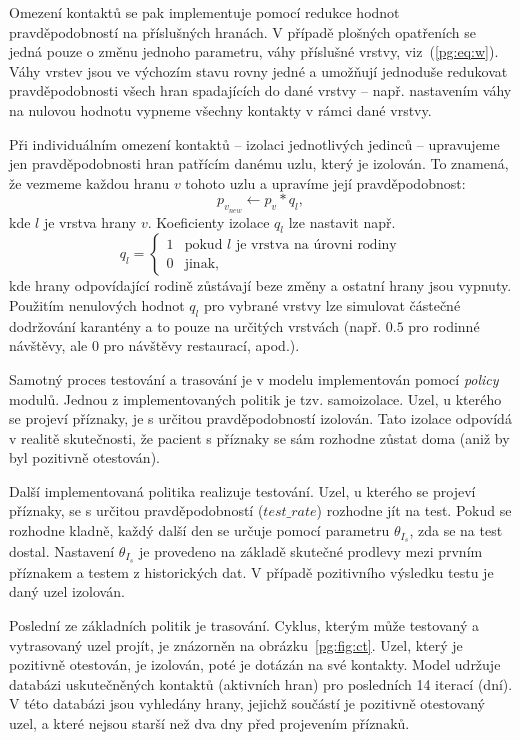 Omezení kontaktů se pak implementuje pomocí redukce hodnot
pravděpodobností na příslušných hranách. V případě plošných opatřeních
se jedná pouze o změnu jednoho parametru, váhy příslušné vrstvy,
viz~(\ref{pg:eq:w}). Váhy vrstev jsou ve výchozím stavu rovny jedné a
umožňují jednoduše redukovat pravděpodobnosti všech hran spadajících
do dané vrstvy --  např. nastavením váhy na nulovou hodnotu vypneme
všechny kontakty v rámci dané vrstvy.

Při individuálním omezení kontaktů -- izolaci jednotlivých jedinců -- upravujeme jen
pravděpodobnosti hran patřícím danému uzlu, který je izolován.  To znamená, že
vezmeme každou hranu $v$ tohoto uzlu a upravíme její pravděpodobnost:
$$
p_{v_{new}} \leftarrow p_{v} * q_l,
$$
kde  $l$  je vrstva hrany  $v$. 
Koeficienty izolace $q_l$ lze nastavit např.
$$
q_l =
\begin{cases}
  1  &  \mbox{pokud } l \mbox{ je vrstva na úrovni rodiny} \\
  0  &  \mbox{jinak,}
\end{cases}
$$
kde hrany odpovídající rodině zůstávají beze změny a ostatní hrany jsou vypnuty.  Použitím nenulových hodnot $q_l$ pro vybrané vrstvy lze simulovat částečné dodržování karantény a to pouze na určitých vrstvách (např. $0.5$ pro rodinné návštěvy, ale $0$ pro návštěvy restaurací, apod.). 


Samotný proces testování a trasování je v modelu implementován pomocí {\em
  policy} modulů. Jednou z implementovaných politik je tzv. samoizolace. Uzel,
u kterého se projeví příznaky, je s určitou pravděpodobností izolován. Tato
izolace odpovídá v realitě skutečnosti, že pacient s příznaky se sám rozhodne
zůstat doma (aniž by byl pozitivně otestován).

Další implementovaná politika realizuje testování. Uzel, u kterého se
projeví příznaky, se s určitou pravděpodobností ($test\_rate$)
rozhodne jít na test.  Pokud se rozhodne kladně, každý další den se
určuje pomocí parametru $\theta_{I_s}$, zda se na test
dostal. Nastavení $\theta_{I_s}$ je provedeno na základě skutečné
prodlevy mezi prvním příznakem a testem z historických dat. V případě
pozitivního výsledku testu je daný uzel izolován.

Poslední ze základních politik je trasování. Cyklus, kterým může testovaný a
vytrasovaný uzel projít, je znázorněn na obrázku~\ref{pg:fig:ct}. Uzel, který je
pozitivně otestován, je izolován, poté je dotázán na své kontakty. Model udržuje
databázi uskutečněných kontaktů (aktivních hran) pro posledních 14 iterací (dní). V této databázi jsou vyhledány hrany, jejichž součástí je pozitivně
otestovaný uzel, a které nejsou starší než dva dny před projevením příznaků.

